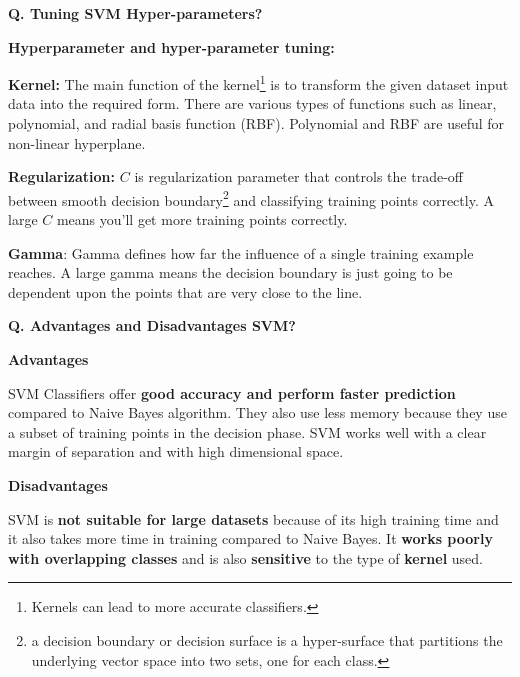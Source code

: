 \begin{frame}[fragile]{\textbf{Q. Tuning SVM Hyper-parameters?}}
  \vspace{.4em}
  \begin{wideitemize}
    \item \textbf{Hyperparameter and hyper-parameter tuning:}
    \begin{wideitemize}
      \item \textbf{Kernel:} The main function of the kernel\footnote{Kernels can lead to more accurate classifiers.}
      is to transform the given dataset input data into the required form. There are various types of
      functions such as linear, polynomial, and radial basis function (RBF). Polynomial and RBF are
      useful for non-linear hyperplane.
      \item \textbf{Regularization:} $C$ is regularization parameter that controls the trade-off between smooth decision
      boundary\footnote{a decision boundary or decision surface is a hyper-surface that partitions
      the underlying vector space into two sets, one for each class.} and classifying training
      points correctly. A large $C$ means you'll get more training points correctly.
      \item \textbf{Gamma}: Gamma defines how far the influence of a single training example reaches.
      A large gamma means the decision boundary is just going to be dependent upon the points that
      are very close to the line.
    \end{wideitemize}
  \end{wideitemize}

\end{frame}

\begin{frame}[fragile]{\textbf{Q. Advantages and Disadvantages SVM?}}
  \vspace{.4em}
  \begin{wideitemize}
    \item \textbf{Advantages}
    \begin{wideitemize}
      \item SVM Classifiers offer \textbf{good accuracy and perform faster prediction}
      compared to Naive Bayes algorithm. They also use less memory because they
      use a subset of training points in the decision phase. SVM works well with
      a clear margin of separation and with high dimensional space.
    \end{wideitemize}
    \item \textbf{Disadvantages}
    \begin{wideitemize}
      \item SVM is \textbf{not suitable for large datasets} because of its high training
      time and it also takes more time in training compared to Naive Bayes. It
      \textbf{works poorly with overlapping classes} and is also \textbf{sensitive} to the type
      of \textbf{kernel} used.
    \end{wideitemize}
  \end{wideitemize}

\end{frame}

